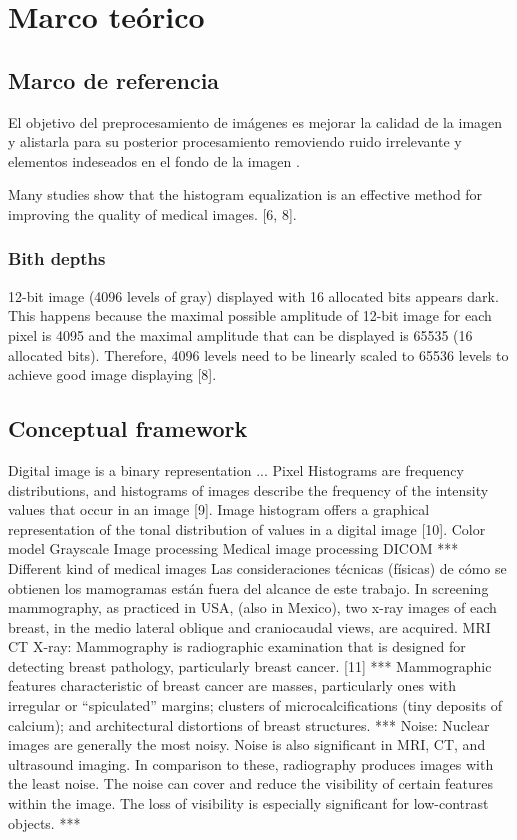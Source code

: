 \chapter{Marco teórico}

\section{Marco de referencia}

El objetivo del preprocesamiento de imágenes es mejorar la calidad de la imagen
y alistarla para su posterior procesamiento removiendo ruido irrelevante y
elementos indeseados en el fondo de la imagen \cite{}.  

Many studies show that the histogram equalization is an effective method for
improving the quality of medical images. [6, 8]. 

\subsection{Bith depths}

12-bit image (4096 levels of gray) displayed with 16 allocated bits appears
dark. This happens because the maximal possible amplitude of 12-bit image for
each pixel is 4095 and the maximal amplitude that can be displayed is 65535 (16
allocated bits). Therefore, 4096 levels need to be linearly scaled to 65536
levels to achieve good image displaying [8].


\section{Conceptual framework}

Digital image is a binary representation ...
Pixel
Histograms are frequency distributions, and histograms of images describe the frequency of the intensity values that occur in an image [9]. Image histogram offers a graphical representation of the tonal distribution of values in a digital image [10].
Color model
Grayscale
Image processing
Medical image processing
DICOM
***
Different kind of medical images
Las consideraciones técnicas (físicas) de cómo se obtienen los mamogramas están fuera del alcance de este trabajo. In screening mammography, as practiced in USA, (also in Mexico), two x-ray images of each breast, in the medio lateral oblique and craniocaudal views, are acquired. 
MRI
CT
X-ray:
Mammography is radiographic examination that is designed for detecting breast pathology, particularly breast cancer. [11]
***
Mammographic features characteristic of breast cancer are masses, particularly ones with irregular or “spiculated” margins; clusters of microcalcifications (tiny deposits of calcium); and architectural distortions of breast structures. 
***
Noise: 
Nuclear images are generally the most noisy. Noise is also significant in MRI, CT, and ultrasound imaging. In comparison to these, radiography produces images with the least noise. 
The noise can cover and reduce the visibility of certain features within the image. The loss of visibility is especially significant for low-contrast objects.
***


